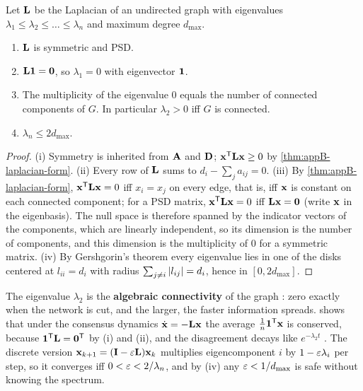 \begin{theorem}
\label{thm:appB-laplacian}
Let $\mathbf{L}$ be the Laplacian of an undirected graph with eigenvalues $\lambda_1 \le \lambda_2 \le \dots \le \lambda_n$ and maximum degree $d_{\max}$.
\begin{enumerate}[label=(\roman*)]
  \item $\mathbf{L}$ is symmetric and PSD.
  \item $\mathbf{L}\mathbf{1} = \mathbf{0}$, so $\lambda_1 = 0$ with eigenvector $\mathbf{1}$.
  \item The multiplicity of the eigenvalue $0$ equals the number of connected components of $G$. In particular $\lambda_2 > 0$ iff $G$ is connected.
  \item $\lambda_n \le 2 d_{\max}$.
\end{enumerate}
\end{theorem}
\begin{proof}
(i) Symmetry is inherited from $\mathbf{A}$ and $\mathbf{D}$; $\mathbf{x}^{\mathsf{T}}\mathbf{L}\mathbf{x} \ge 0$ by \cref{thm:appB-laplacian-form}. (ii) Every row of $\mathbf{L}$ sums to $d_i - \sum_j a_{ij} = 0$. (iii) By \cref{thm:appB-laplacian-form}, $\mathbf{x}^{\mathsf{T}}\mathbf{L}\mathbf{x} = 0$ iff $x_i = x_j$ on every edge, that is, iff $\mathbf{x}$ is constant on each connected component; for a PSD matrix, $\mathbf{x}^{\mathsf{T}}\mathbf{L}\mathbf{x} = 0$ iff $\mathbf{L}\mathbf{x} = \mathbf{0}$ (write $\mathbf{x}$ in the eigenbasis). The null space is therefore spanned by the indicator vectors of the components, which are linearly independent, so its dimension is the number of components, and this dimension is the multiplicity of $0$ for a symmetric matrix. (iv) By Gershgorin's theorem every eigenvalue lies in one of the disks centered at $l_{ii} = d_i$ with radius $\sum_{j \ne i}\left\lvert l_{ij} \right\rvert = d_i$, hence in $[0, 2d_{\max}]$. \qedhere
\end{proof}

The eigenvalue $\lambda_2$ is the \textbf{algebraic
connectivity} of the graph
\cite{fiedler1973algebraic}: zero exactly when the network is cut, and the
larger, the faster information spreads.  shows that under the
consensus dynamics $\dot{\mathbf{x}} = -\mathbf{L}\mathbf{x}$ the average
$\tfrac1n\mathbf{1}^{\mathsf{T}}\mathbf{x}$ is conserved, because $\mathbf{1}^{\mathsf{T}}\mathbf{L} =
\mathbf{0}^{\mathsf{T}}$ by (i) and (ii), and the disagreement decays like $e^{-\lambda_2
t}$ \cite{olfatisaber2007consensus}. The discrete version $\mathbf{x}_{k+1} =
(\mathbf{I} - \varepsilon\mathbf{L})\mathbf{x}_k$ multiplies eigencomponent $i$ by $1 -
\varepsilon\lambda_i$ per step, so it converges iff $0 < \varepsilon < 2/\lambda_n$, and by
(iv) any $\varepsilon < 1/d_{\max}$ is safe without knowing the spectrum.

